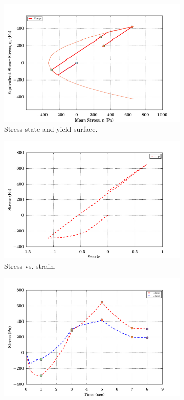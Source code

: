 \begin{figure}[htbp!]
  \begin{subfigure}{0.5\textwidth}
    \centering
    \includegraphics[width=\textwidth]{MPMMaterials/FIGS/UniaxialStrainLoadUnloadNonLinDPNonLin_yield_surface.pdf}
    \caption{Stress state and yield surface.}
  \end{subfigure}
  \begin{subfigure}{0.5\textwidth}
    \centering
    \includegraphics[width=\textwidth]{MPMMaterials/FIGS/UniaxialStrainLoadUnloadNonLinDPNonLin_sigma_eps.pdf}
    \caption{Stress vs. strain.}
  \end{subfigure}
  \begin{subfigure}{0.5\textwidth}
    \centering
    \includegraphics[width=\textwidth]{MPMMaterials/FIGS/UniaxialStrainLoadUnloadNonLinDPNonLin_pq_time.pdf}

\end{subfigure}
\end{figure}
